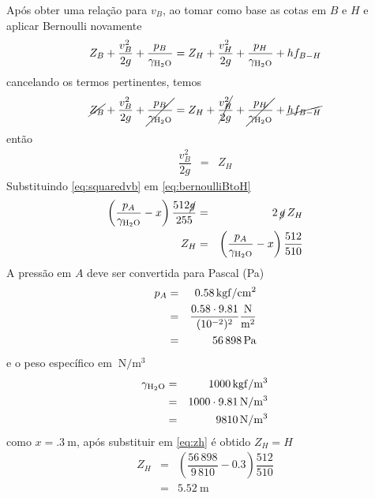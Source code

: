 \documentclass[a4paper, 12pt, brazilian]{article}
\begin{document}
	Após obter uma relação para $v_{B}$, ao tomar como base as cotas em $B$ e $H$ e aplicar Bernoulli novamente
	\begin{equation}
			Z_{B}+\dfrac{v_{B}^{2}}{2g}+\dfrac{p_{B}}{\gamma_{\ce{H2O}}}=Z_{H}+\dfrac{v_{H}^{2}}{2g}+\dfrac{p_{H}}{\gamma_{\ce{H2O}}}+hf_{B-H}
	\end{equation}
	cancelando os termos pertinentes, temos
	\begin{equation}
		\cancel{Z_{B}}+\dfrac{v_{B}^{2}}{2g}+\cancel{\dfrac{p_{B}}{\gamma_{\ce{H2O}}}}=Z_{H}+\cancel{\dfrac{v_{H}^{2}}{2g}}+\cancel{\dfrac{p_{H}}{\gamma_{\ce{H2O}}}}+\cancel{hf_{B-H}}
	\end{equation}
	então
	\begin{eqnarray}
		\label{eq:bernoulliBtoH}
		\dfrac{v_{B}^{2}}{2g}&=&Z_{H}
	\end{eqnarray}
	Substituindo \eqref{eq:squaredvb} em \eqref{eq:bernoulliBtoH}
	\begin{eqnarray}
		\left(\dfrac{p_{A}}{\gamma_{\ce{H2O}}}-x\right)\dfrac{512\cancel{g}}{255}&=&2\,\cancel{g}\,Z_{H}\\
		Z_{H}&=&\left(\dfrac{p_{A}}{\gamma_{\ce{H2O}}}-x\right)\dfrac{512}{510}\label{eq:zh}
	\end{eqnarray}
	A pressão em $A$ deve ser convertida para Pascal (Pa)
	\begin{eqnarray}
		p_{A}&=&\SI{.58}{\kilogram f/\centi\meter^{2}}\\
			 &=&\dfrac{0.58\cdot 9.81}{(10^{-2})^{2}}\SI{}{\dfrac{\newton}{\meter^{2}}}\\
			 &=&\SI{56898}{\pascal}
	\end{eqnarray}
	e o peso específico em $\SI{}{\newton/\meter^{3}}$
	\begin{eqnarray}
		\gamma_{\ce{H2O}}&=&\SI{1000}{\kilogram f/\meter^{3}}\\
						 &=&1000\cdot 9.81\,\SI{}{\newton/\meter^{3}}\\
						 &=&\SI{9810}{\newton/\meter^{3}}
	\end{eqnarray}
	como $x=\SI{.3}{\meter}$, após substituir em \eqref{eq:zh} é obtido $Z_{H}=H$
	\begin{eqnarray}
		Z_{H}&=&\left(\dfrac{56\,898}{9\,810}-0.3\right)\dfrac{512}{510}\\
			 &=&\SI{5.52}{\meter}
	\end{eqnarray}
\end{document}
